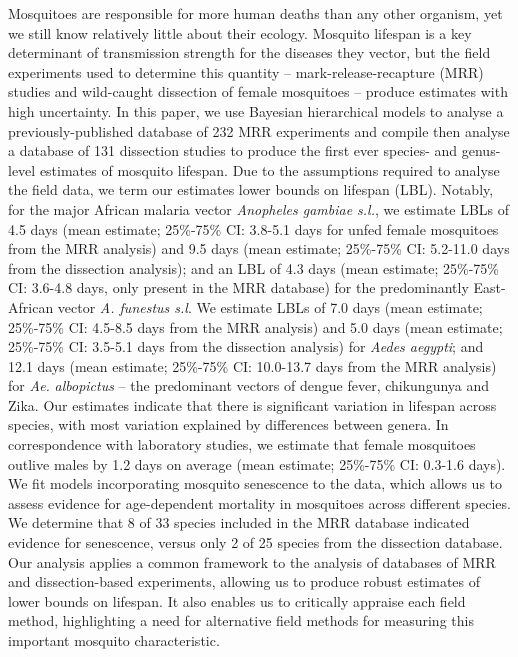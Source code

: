 \documentclass[]{article}
\begin{document}
Mosquitoes are responsible for more human deaths than any other
organism, yet we still know relatively little about their ecology.
Mosquito lifespan is a key determinant of transmission strength for the
diseases they vector, but the field experiments used to determine this
quantity -- mark-release-recapture (MRR) studies and wild-caught
dissection of female mosquitoes -- produce estimates with high
uncertainty. In this paper, we use Bayesian hierarchical models to
analyse a previously-published database of 232 MRR experiments and
compile then analyse a database of 131 dissection studies to produce the
first ever species- and genus-level estimates of mosquito lifespan. Due
to the assumptions required to analyse the field data, we term our
estimates lower bounds on lifespan (LBL). Notably, for the major African
malaria vector \emph{Anopheles gambiae s.l.}, we estimate LBLs of 4.5
days (mean estimate; 25\%-75\% CI: 3.8-5.1 days for unfed female
mosquitoes from the MRR analysis) and 9.5 days (mean estimate;
25\%-75\% CI: 5.2-11.0 days from the dissection analysis); and an LBL of
4.3 days (mean estimate; 25\%-75\%
CI: 3.6-4.8 days, only present in the MRR database) for the
predominantly East-African vector \emph{A. funestus s.l}. We estimate
LBLs of 7.0 days (mean estimate; 25\%-75\% CI: 4.5-8.5 days from the
MRR analysis) and 5.0 days (mean estimate; 25\%-75\% CI: 3.5-5.1 days
from the dissection analysis) for \emph{Aedes aegypti}; and 12.1 days
(mean estimate; 25\%-75\% CI: 10.0-13.7 days from the MRR analysis)
for \emph{Ae.} \emph{albopictus} -- the predominant vectors of dengue
fever, chikungunya and Zika. Our estimates indicate that there is
significant variation in lifespan across species, with most variation
explained by differences between genera. In correspondence with
laboratory studies, we estimate that female mosquitoes outlive males by
1.2 days on average (mean estimate; 25\%-75\% CI: 0.3-1.6 days). We
fit models incorporating mosquito senescence to the data, which allows
us to assess evidence for age-dependent mortality in mosquitoes across
different species. We determine that 8 of 33 species included in the MRR
database indicated evidence for senescence, versus only 2 of 25 species
from the dissection database. Our analysis applies a common framework to
the analysis of databases of MRR and dissection-based experiments,
allowing us to produce robust estimates of lower bounds on lifespan. It
also enables us to critically appraise each field method, highlighting a need for alternative field methods for measuring this
important mosquito characteristic.
\end{document}
